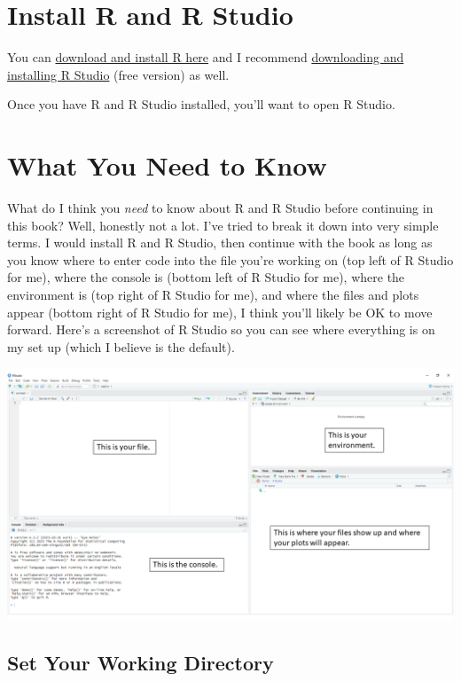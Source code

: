 \documentclass[
]{book}
\begin{document}
\hypertarget{install-r-and-r-studio}{%
\section{Install R and R Studio}\label{install-r-and-r-studio}}

You can \href{https://www.r-project.org/}{download and install R here} and I recommend \href{https://posit.co/download/rstudio-desktop/}{downloading and installing R Studio} (free version) as well.

Once you have R and R Studio installed, you'll want to open R Studio.

\hypertarget{what-you-need-to-know}{%
\section{What You Need to Know}\label{what-you-need-to-know}}

What do I think you \emph{need} to know about R and R Studio before continuing in this book? Well, honestly not a lot. I've tried to break it down into very simple terms. I would install R and R Studio, then continue with the book as long as you know where to enter code into the file you're working on (top left of R Studio for me), where the console is (bottom left of R Studio for me), where the environment is (top right of R Studio for me), and where the files and plots appear (bottom right of R Studio for me), I think you'll likely be OK to move forward. Here's a screenshot of R Studio so you can see where everything is on my set up (which I believe is the default).

\includegraphics[width=1\textwidth,height=\textheight]{images/Rstudio.png}

\hypertarget{set-your-working-directory}{%
\subsection{Set Your Working Directory}\label{set-your-working-directory}}
\end{document}
